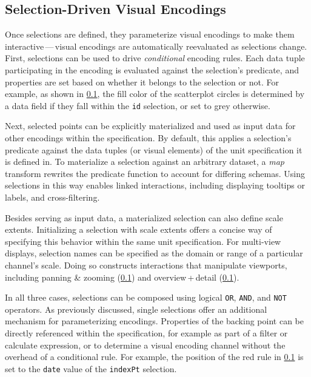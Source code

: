 \subsection{Selection-Driven Visual Encodings}

Once selections are defined, they parameterize visual encodings to make them
interactive\,---\,visual encodings are automatically reevaluated as selections
change. First, selections can be used to drive \emph{conditional} encoding
rules. Each data tuple participating in the encoding is evaluated against the
selection's predicate, and properties are set based on whether it belongs to the
selection or not. For example, as shown in \cref{}, the fill
color of the scatterplot circles is determined by a data field if they fall
within the \texttt{id} selection, or set to grey otherwise.

Next, selected points can be explicitly materialized and used as input data for
other encodings within the specification. By default, this applies a selection's
predicate against the data tuples (or visual elements) of the unit specification
it is defined in. To materialize a selection against an arbitrary dataset, a
\emph{map} transform rewrites the predicate function to account for differing
schemas. Using selections in this way enables linked interactions, including
displaying tooltips or labels, and cross-filtering.

Besides serving as input data, a materialized selection can also define scale
extents. Initializing a selection with scale extents offers a concise way of
specifying this behavior within the same unit specification. For multi-view
displays, selection names can be specified as the domain or range of a
particular channel's scale. Doing so constructs interactions that manipulate
viewports, including panning \& zooming (\cref{}) and
overview\,+\,detail (\cref{}).

In all three cases, selections can be composed using logical \texttt{OR},
\texttt{AND}, and \texttt{NOT} operators. As previously discussed, single
selections offer an additional mechanism for parameterizing encodings.
Properties of the backing point can be directly referenced within  the
specification, for example as part of a filter or calculate expression, or to
determine a visual encoding channel without the overhead of a conditional rule.
For example, the position of the red rule in \cref{} is set to
the \texttt{date} value of the \texttt{indexPt} selection.

